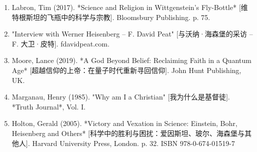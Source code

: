 \begin{enumerate}
\item Labron, Tim (2017). *Science and Religion in Wittgenstein's Fly-Bottle* [维特根斯坦的飞瓶中的科学与宗教]. Bloomsbury Publishing. p. 75.  
\item "Interview with Werner Heisenberg – F. David Peat" [与沃纳·海森堡的采访 – F. 大卫·皮特]. fdavidpeat.com.  
\item Moore, Lance (2019). *A God Beyond Belief: Reclaiming Faith in a Quantum Age* [超越信仰的上帝：在量子时代重新寻回信仰]. John Hunt Publishing, UK.  
\item Marganau, Henry (1985). "Why am I a Christian" [我为什么是基督徒]. *Truth Journal*, Vol. I.  
\item Holton, Gerald (2005). *Victory and Vexation in Science: Einstein, Bohr, Heisenberg and Others* [科学中的胜利与困扰：爱因斯坦、玻尔、海森堡与其他人]. Harvard University Press, London. p. 32. ISBN 978-0-674-01519-7


\end{enumerate}
